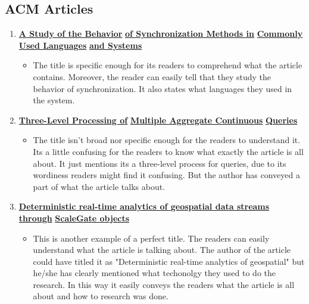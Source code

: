 \documentclass[11pt,twocolumn]{article}
\begin{document}
\begin{itemize}
\subsection{ACM Articles}

 	\begin{enumerate}
\item \underline{\bf{A Study of the Behavior}}
\underline{\bf{of Synchronization Methods in}}
\underline{\bf{Commonly Used Languages}}
\underline{\bf{and Systems}}
  \begin{itemize}
   \item The title is specific enough for its readers to comprehend what the article contains. Moreover, the reader can easily tell that they study the behavior of synchronization. It also states what languages they used in the system. \cite{sync}
  \end{itemize}

\item \underline{\bf{Three-Level Processing of}}
\underline{\bf{Multiple Aggregate Continuous}}
\underline{\bf{Queries}}
   \begin{itemize}
    \item The title isn't broad nor specific enough for the readers to understand it. Its a little confusing for the readers to know what exactly the article is all about. It just mentions its a three-level process for queries, due to its wordiness readers might find it confusing. But the author has conveyed a part of what the article talks about. \cite{query}
   \end{itemize}

\item \underline{\bf{Deterministic real-time analytics of }}
\underline{\bf{geospatial data streams through}}
\underline{\bf{ScaleGate objects}}
   \begin{itemize}
   \item This is another example of a perfect title. The readers can easily understand what the article is talking about. The author of the article could have titled it as "Deterministic real-time analytics of geospatial" but he/she has clearly mentioned what techonolgy they used to do the research. In this way it easily conveys the readers what the article is all about and how to research was done.\cite{real}
   \end{itemize}
 \end{enumerate}
	
\end{itemize}


 
\end{document}
